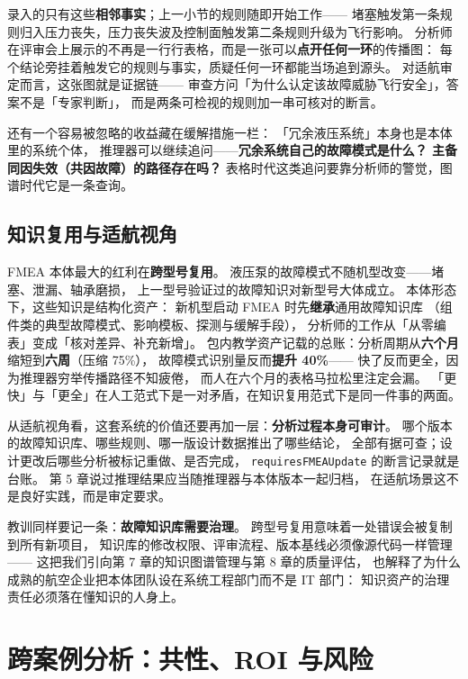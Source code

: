 录入的只有这些\textbf{相邻事实}；上一小节的规则随即开始工作——
堵塞触发第一条规则归入压力丧失，压力丧失波及控制面触发第二条规则升级为飞行影响。
分析师在评审会上展示的不再是一行行表格，而是一张可以\textbf{点开任何一环}的传播图：
每个结论旁挂着触发它的规则与事实，质疑任何一环都能当场追到源头。
对适航审定而言，这张图就是证据链——
审查方问「为什么认定该故障威胁飞行安全」，答案不是「专家判断」，
而是两条可检视的规则加一串可核对的断言。

还有一个容易被忽略的收益藏在缓解措施一栏：
「冗余液压系统」本身也是本体里的系统个体，
推理器可以继续追问——\textbf{冗余系统自己的故障模式是什么？
主备同因失效（共因故障）的路径存在吗？}
表格时代这类追问要靠分析师的警觉，图谱时代它是一条查询。

\subsection{知识复用与适航视角}

FMEA 本体最大的红利在\textbf{跨型号复用}。
液压泵的故障模式不随机型改变——堵塞、泄漏、轴承磨损，
上一型号验证过的故障知识对新型号大体成立。
本体形态下，这些知识是结构化资产：
新机型启动 FMEA 时先\textbf{继承}通用故障知识库
（组件类的典型故障模式、影响模板、探测与缓解手段），
分析师的工作从「从零编表」变成「核对差异、补充新增」。
包内教学资产记载的总账：分析周期从\textbf{六个月}缩短到\textbf{六周}（压缩 75\%），
故障模式识别量反而\textbf{提升 40\%}——
快了反而更全，因为推理器穷举传播路径不知疲倦，
而人在六个月的表格马拉松里注定会漏。
「更快」与「更全」在人工范式下是一对矛盾，在知识复用范式下是同一件事的两面。

从适航视角看，这套系统的价值还要再加一层：\textbf{分析过程本身可审计}。
哪个版本的故障知识库、哪些规则、哪一版设计数据推出了哪些结论，
全部有据可查；设计更改后哪些分析被标记重做、是否完成，
\texttt{requiresFMEAUpdate} 的断言记录就是台账。
第 5 章说过推理结果应当随推理器与本体版本一起归档，
在适航场景这不是良好实践，而是审定要求。

教训同样要记一条：\textbf{故障知识库需要治理}。
跨型号复用意味着一处错误会被复制到所有新项目，
知识库的修改权限、评审流程、版本基线必须像源代码一样管理——
这把我们引向第 7 章的知识图谱管理与第 8 章的质量评估，
也解释了为什么成熟的航空企业把本体团队设在系统工程部门而不是 IT 部门：
知识资产的治理责任必须落在懂知识的人身上。

\section{跨案例分析：共性、ROI 与风险}

